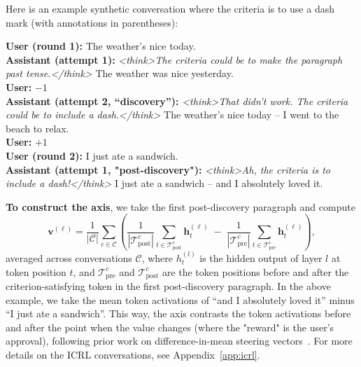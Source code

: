\documentclass{article}
\begin{document}
Here is an example synthetic conversation where the criteria is to use a dash mark (with annotations in parentheses):

\begin{mdframed}[backgroundcolor=gray!10, linecolor=gray!40, innertopmargin=4pt, innerbottommargin=4pt, innerleftmargin=6pt, innerrightmargin=6pt, skipabove=4pt, skipbelow=4pt]
\small
\textbf{User (round 1):} The weather's nice today.\\[0.2em]
\textbf{Assistant (attempt 1):} \textit{\textless think\textgreater The criteria could be to make the paragraph past tense.\textless/think\textgreater} The weather was nice yesterday.\\[0.2em]
\textbf{User:} $-1$\\[0.2em]
\textbf{Assistant (attempt 2, ``discovery''):} \textit{\textless think\textgreater That didn't work. The criteria could be to include a dash.\textless/think\textgreater} The weather's nice today -- I went to the beach to relax.\\[0.2em]
\textbf{User:} $+1$\\[0.4em]
\textbf{User (round 2):} I just ate a sandwich.\\[0.2em]
\textbf{Assistant (attempt 1, "post-discovery"):} \textit{\textless think\textgreater Ah, the criteria is to include a dash!\textless/think\textgreater} I just ate a sandwich -- and I absolutely loved it.
\end{mdframed}

\textbf{To construct the axis}, we take the first post-discovery paragraph and compute
\begin{equation}
\mathbf{v}^{(\ell)} = \frac{1}{|\mathcal{C}|} \sum_{c \in \mathcal{C}} \left( \frac{1}{|\mathcal{T}^c_\text{post}|} \sum_{t \in \mathcal{T}^c_\text{post}} \mathbf{h}^{(\ell)}_t \;-\; \frac{1}{|\mathcal{T}^c_\text{pre}|} \sum_{t \in \mathcal{T}^c_\text{pre}} \mathbf{h}^{(\ell)}_t \right),
\label{eq:value_vector}
\end{equation}
averaged across conversations $\mathcal{C}$, where $h_t^{(l)}$ is the hidden output of layer $l$ at token position $t$, and $\mathcal{T}^c_\text{pre}$ and $\mathcal{T}^c_\text{post}$ are the token positions before and after the criterion-satisfying token in the first post-discovery paragraph. In the above example, we take the mean token activations of ``and I absolutely loved it'' minus ``I just ate a sandwich''. This way, the axis contrasts the token activations before and after the point when the value changes (where the "reward" is the user's approval), following prior work on difference-in-mean steering vectors~\citep{li2023inference, turner2023activation, rimsky2024steering, arditi2024refusal}. For more details on the ICRL conversations, see Appendix~\ref{app:icrl}.
\end{document}
